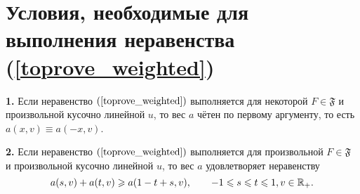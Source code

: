 \section{Условия, необходимые для выполнения неравенства (\ref{toprove_weighted})}
\begin{thm}
\label{necessary_conditions_constant}
\textbf{1.}
Если неравенство $(\ref{toprove_weighted})$ выполняется для некоторой $F \in \mathfrak{F}$
и произвольной кусочно линейной $u$,
то вес $a$ чётен по первому аргументу,
то есть $a(x, v) \equiv a(-x, v)$.

\textbf{2.}
Если неравенство $(\ref{toprove_weighted})$ выполняется для произвольной $F \in \mathfrak{F}$
и произвольной кусочно линейной $u$, то вес $a$ удовлетворяет неравенству
\begin{equation}
\label{almostConcave}
a(s, v) + a(t, v) \ge a(1 - t + s, v), \qquad -1 \le s \le t \le 1, v \in \Real_+.
\end{equation}
\end{thm}

